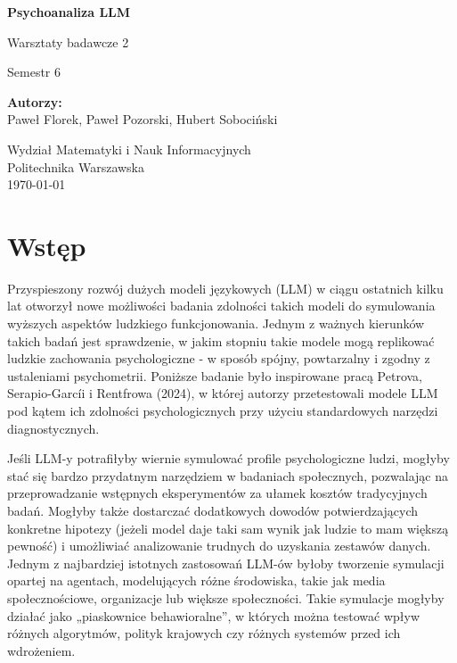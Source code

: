 \documentclass{article}
\begin{document}
\begin{titlepage}
    \centering
    \vspace*{1cm}

    \Huge
    \textbf{Psychoanaliza LLM}

    \vspace{0.5cm}
    \LARGE
    Warsztaty badawcze 2
    

    \LARGE
    Semestr 6

    \vspace{1.5cm}

    \textbf{Autorzy:}\\
    Paweł Florek, Paweł Pozorski, Hubert Sobociński

    \vfill

    \vfill

    \Large
    Wydział Matematyki i Nauk Informacyjnych \\
    Politechnika Warszawska\\
    \today

\end{titlepage}

\tableofcontents

\newpage
\section{Wstęp}
Przyspieszony rozwój dużych modeli językowych (LLM) w ciągu ostatnich kilku lat otworzył nowe możliwości badania zdolności takich modeli do symulowania wyższych 
aspektów ludzkiego funkcjonowania. Jednym z ważnych kierunków takich badań jest sprawdzenie, w jakim stopniu takie modele mogą replikować ludzkie zachowania 
psychologiczne - w sposób spójny, powtarzalny i zgodny z ustaleniami psychometrii. Poniższe badanie było inspirowane pracą Petrova, Serapio-Garcíi i 
Rentfrowa (2024), w której autorzy przetestowali modele LLM pod kątem ich zdolności psychologicznych przy użyciu standardowych narzędzi diagnostycznych.

Jeśli LLM-y potrafiłyby wiernie symulować profile psychologiczne ludzi, mogłyby stać się bardzo przydatnym narzędziem w badaniach społecznych, 
pozwalając na przeprowadzanie wstępnych eksperymentów za ułamek kosztów tradycyjnych badań. Mogłyby także dostarczać dodatkowych dowodów potwierdzających 
konkretne hipotezy (jeżeli model daje taki sam wynik jak ludzie to mam większą pewność) i umożliwiać analizowanie trudnych do uzyskania zestawów danych.
Jednym z najbardziej istotnych zastosowań LLM-ów byłoby tworzenie symulacji opartej na agentach, modelujących różne środowiska, takie jak media społecznościowe, 
organizacje lub większe społeczności. Takie symulacje mogłyby działać jako „piaskownice behawioralne”, w których można testować wpływ różnych algorytmów, 
polityk krajowych czy różnych systemów przed ich wdrożeniem.
\end{document}
